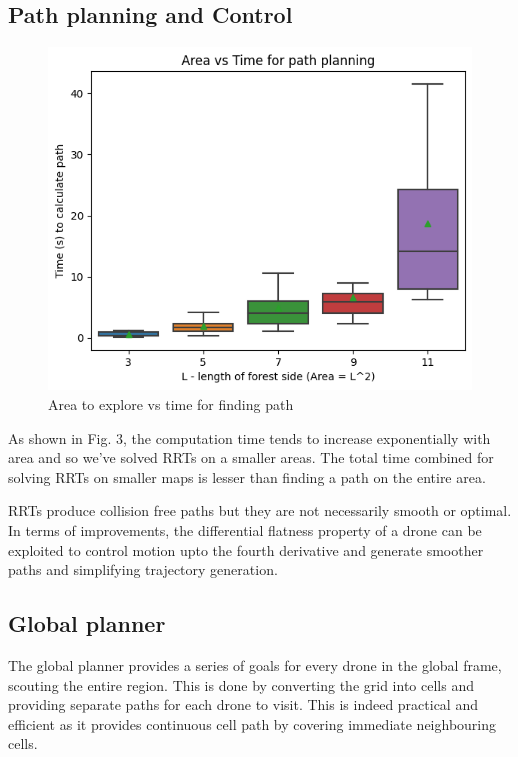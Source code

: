 \subsection{Path planning and Control}

\begin{figure}[h]
\centering
\includegraphics[scale=0.5]{images/time_area.png}
\caption{Area to explore vs time for finding path}
\end{figure}


As shown in Fig. 3, the computation time tends to increase exponentially with area and so we've solved RRTs on a smaller areas. The total time combined for solving RRTs on smaller maps is lesser than finding a path on the entire area.

RRTs produce collision free paths but they are not necessarily smooth or optimal.
In terms of improvements, the differential flatness property of a drone can be exploited to control motion upto the fourth derivative and generate smoother paths and simplifying trajectory generation.

 
\subsection{Global planner}

The global planner provides a series of goals for every drone in the global frame, scouting the entire region. This is done by converting the grid into cells and providing separate paths for each drone to visit. This is indeed practical and efficient as it provides continuous cell path by covering immediate neighbouring cells.

